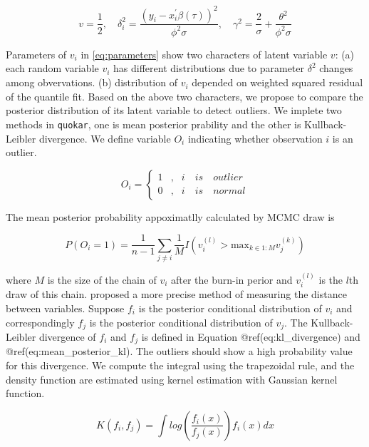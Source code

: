 \documentclass[article]{jss}
\theoremstyle{definition}
\theoremstyle{definition}
\theoremstyle{remark}
\begin{document}
\begin{equation}
v=\frac{1}{2}, \quad \delta^{2}_{i}=\frac{(y_i-x^{'}_{i}\beta(\tau))^{2}}{\phi^{2}\sigma}, \quad 
\gamma^2=\frac{2}{\sigma}+\frac{\theta^{2}}{\phi^{2}\sigma}
\label{eq:parameters}
\end{equation}

Parameters of \(v_i\) in \eqref{eq:parameters} show two characters of
latent variable \(v\): (a) each random variable \(v_i\) has different
distributions due to parameter \(\delta^2\) changes among obvervations.
(b) distribution of \(v_i\) depended on weighted squared residual of the
quantile fit. Based on the above two characters, we propose to compare
the posterior distribution of its latent variable to detect outliers. We
implete two methods in \texttt{quokar}, one is mean posterior prability
and the other is Kullback-Leibler divergence. We define variable \(O_i\)
indicating whether observation \(i\) is an outlier.

\begin{equation}
O_i = \left\{
\begin{aligned}
1 & , & i \quad is \quad outlier \\
0 & , & i \quad is \quad normal
\end{aligned}
\right.
\label{eq:indicating_outlier}
\end{equation}

The mean posterior probability appoximatlly calculated by MCMC draw is

\begin{equation}
P(O_i = 1)=\frac{1}{n-1}\sum_{j \neq i}\frac{1}{M}I(v^{(l)}_{i}> \text{max}_{k \in 1:M}v^{(k)}_j)
\label{eq:mcmc_draw}
\end{equation}

where \(M\) is the size of the chain of \(v_i\) after the burn-in perior
and \(v^{(l)}_i\) is the \(l\)th draw of this chain.
\citet{kullback1951information} proposed a more precise method of
measuring the distance between variables. Suppose \(f_i\) is the
posterior conditional distribution of \(v_i\) and correspondingly
\(f_j\) is the posterior conditional distribution of \(v_j\). The
Kullback-Leibler divergence of \(f_i\) and \(f_j\) is defined in
Equation @ref(eq:kl\_divergence) and @ref(eq:mean\_posterior\_kl). The
outliers should show a high probability value for this divergence. We
compute the integral using the trapezoidal rule, and the density
function are estimated using kernel estimation with Gaussian kernel
function.

\begin{equation}
K(f_i, f_j)=\int log(\frac{f_i(x)}{f_j(x)})f_{i}(x)dx
\label{eq:kl_divergence}
\end{equation}
\end{document}
